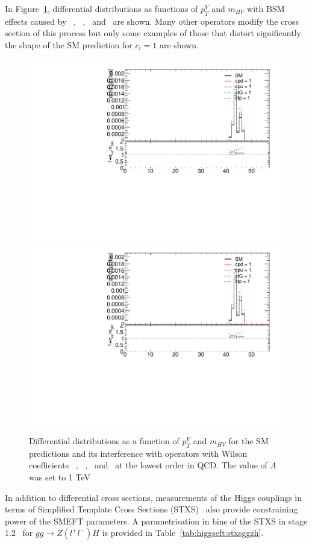 In Figure~\ref{fig:higgseft:ggzh}, differential distributions as functions of $p_{T}^{V}$ and $m_{HV}$  with BSM effects caused by \cpqi\ , \cpu\ , \ctG\ and \ctp\ are shown.  Many other operators modify the cross section of this process but only some examples of those that distort significantly the shape of the SM prediction for  $c_i=1$ are shown.

\begin{figure}
\includegraphics[width=0.49\linewidth,page=7]{figures/kinematics_ggHll_np0.pdf}
\includegraphics[width=0.49\linewidth,page=10]{figures/kinematics_ggHll_np0.pdf}
\label{fig:higgseft:ggzh}
\caption{Differential distributions as a function of $p_{T}^{V}$ and $m_{HV}$ for the SM predictions and its interference with operators with Wilson coefficients \ctG\ , \cpd\ , \cpu\ and \ctp\  at the lowest order in QCD. The value of $\Lambda$ was set to 1 TeV}  
\end{figure}

In addition to differential cross sections, measurements  of the Higgs couplings in terms of Simplified Template Cross Sections (STXS)~\cite{deFlorian:2016spz} also provide constraining power of the SMEFT parameters. A parametrisation in bins of the STXS in stage 1.2~\cite{Berger:2019wnu}  for $gg\to Z(l^{+}l^{-})H$  is provided in Table~\ref{tab:higgseft:stxsggzh}.

